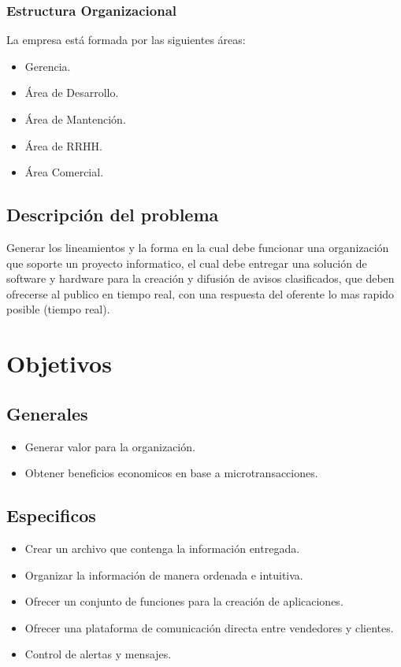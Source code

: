 \documentclass[letterpaper,openright,10pt,twoside]{report}
\begin{document}
			\subsection{Estructura Organizacional}
				La empresa está formada por las siguientes áreas:
				\begin{itemize}
					\item Gerencia.
					\item Área de Desarrollo.
					\item Área de Mantención.
					\item Área de RRHH.
					\item Área Comercial.
\end{itemize}
		\section{Descripción del problema}
		Generar los lineamientos y la forma en la cual debe funcionar una organización que soporte un proyecto informatico, el cual debe entregar una solución de software y hardware para la creación y difusión de avisos clasificados, que deben ofrecerse al publico en tiempo real, con una respuesta del oferente lo mas rapido posible (tiempo real).
	\chapter{Objetivos}
		\section{Generales}
			\begin{itemize}
				\item Generar valor para la organización.
				\item Obtener beneficios economicos en base a microtransacciones.
			\end{itemize}
		\section{Especificos}
			\begin{itemize}
				\item Crear un archivo que contenga la información entregada.
				\item Organizar la información de manera ordenada e intuitiva.
				\item Ofrecer un conjunto de funciones para la creación de aplicaciones.
				\item Ofrecer una plataforma de comunicación directa entre vendedores y clientes.
				\item Control de alertas y mensajes.
			\end{itemize}
\end{document}
